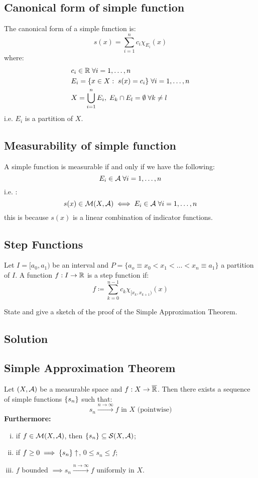 \subsection{Canonical form of simple function} \label{simple:canon}
The canonical form of a simple function is:
\[
    s(x) = \sum_{i=1}^n c_i \chi_{E_i}(x)
\]
where:
\begin{align*}
     & c_i \in \mathbb{R} \; \forall i=1,\dots,n                                      \\
     & E_i = \{ x\in X : \; s(x)=c_i \} \; \forall i=1,\dots,n                \\
     & X = \bigcup_{i=1}^n E_i, \; E_k\cap E_l = \emptyset \; \forall k\neq l
\end{align*}
i.e. $E_i$ is a partition of $X$.

\subsection{Measurability of simple function}
A simple function is measurable if and only if we have the following:
\[
    E_i \in \mathcal{A} \; \forall i=1,\dots,n
\]
i.e. :
\[
    s(x)\in \mathcal{M}(X,\mathcal{A}) \iff E_i \in \mathcal{A} \; \forall i=1,\dots,n
\]
this is because $s(x)$ is a linear combination of indicator functions.

\subsection{Step Functions}
Let $I=[a_0,a_1)$ be an interval and $P=\{ a_o \equiv x_0 < x_1 < \dots < x_n \equiv a_1 \}$ a partition of $I$. A function $f:I\to\mathbb{R}$ is a step function if:
\[
    f \coloneqq \sum_{k=0}^{n-1} c_k \chi_{[x_k,x_{k+1})} (x)
\]


\question

State and give a sketch of the proof of the Simple Approximation Theorem.

\subsection*{Solution}

\subsection{Simple Approximation Theorem}\label{SAT}
Let $(X,\mathcal{A})$ be a measurable space and $f:X\to\overline{\mathbb{R}}$. Then there exists a sequence of simple functions $\{ s_n \}$ such that:
\[
    s_n \xrightarrow{n\to\infty} f \text{ in } X \text{ (pointwise)}
\]
\textbf{Furthermore:}
\begin{enumerate}[i)]
    \item if $f\in\mathcal{M}(X,\mathcal{A})$, then $\{ s_n \}\subseteq\mathcal{S}(X,\mathcal{A})$;
    \item if $f\geq 0 \implies \{ s_n \} \uparrow$, $0\leq s_n \leq f$;
    \item $f$ bounded $\implies s_n \xrightarrow{n\to\infty} f$ uniformly in $X$.
\end{enumerate}

